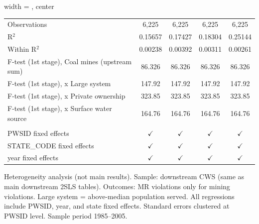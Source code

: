 \begin{table}[htbp]
\begin{adjustbox}{width = \textwidth, center}
\begin{tabular}{lcccc}
          \\
         
         Observations                                  & 6,225         & 6,225         & 6,225                    & 6,225\\  
         R$^2$                                         & 0.15657       & 0.17427       & 0.18304                  & 0.25144\\  
         Within R$^2$                                  & 0.00238       & 0.00392       & 0.00311                  & 0.00261\\  
         F-test (1st stage), Coal mines (upstream sum) & 86.326        & 86.326        & 86.326                   & 86.326\\  
         F-test (1st stage),   x Large system          & 147.92        & 147.92        & 147.92                   & 147.92\\  
         F-test (1st stage),   x Private ownership     & 323.85        & 323.85        & 323.85                   & 323.85\\  
         F-test (1st stage),   x Surface water source  & 164.76        & 164.76        & 164.76                   & 164.76\\  
         
          \\
         
         PWSID fixed effects                           & $\checkmark$  & $\checkmark$  & $\checkmark$             & $\checkmark$\\   
         STATE\_CODE fixed effects                     & $\checkmark$  & $\checkmark$  & $\checkmark$             & $\checkmark$\\   
         year fixed effects                            & $\checkmark$  & $\checkmark$  & $\checkmark$             & $\checkmark$\\   
         
         \bottomrule
         
      \end{tabular}
      
      
      
   \end{adjustbox}
      {\tiny\linespread{1}\selectfont \par \raggedright 
   Heterogeneity analysis (not main results). Sample: downstream CWS (same as main downstream 2SLS tables). Outcomes: MR violations only for mining violations. Large system = above-median population served. All regressions include PWSID, year, and state fixed effects. Standard errors clustered at PWSID level. Sample period 1985--2005.}
   
\end{table}


